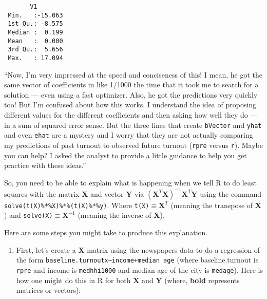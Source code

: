 \documentclass[10pt,]{article}
\providecommand{\tightlist}{%
  \setlength{\itemsep}{0pt}\setlength{\parskip}{0pt}}
\begin{document}
\begin{verbatim}
       V1         
 Min.   :-15.063  
 1st Qu.: -8.575  
 Median :  0.199  
 Mean   :  0.000  
 3rd Qu.:  5.656  
 Max.   : 17.094  
\end{verbatim}

``Now, I'm very impressed at the speed and conciseness of this! I mean,
he got the same vector of coefficients in like 1/1000 the time that it
took me to search for a solution --- even using a fast optimizer. Also,
he got the predictions very quickly too! But I'm confused about how this
works. I understand the idea of proposing different values for the
different coefficients and then asking how well they do --- in a sum of
squared error sense. But the three lines that create \texttt{bVector}
and \texttt{yhat} and even \texttt{ehat} are a mystery and I worry that
they are not actually comparing my predictions of past turnout to
observed future turnout (\texttt{rpre} versus \texttt{r}). Maybe you can
help? I asked the analyst to provide a little guidance to help you get
practice with these ideas.''

So, you need to be able to explain what is happening when we tell R to
do least squares with the matrix \(\bm{X}\) and vector \(\bm{Y}\) via
\((\bm{X}^{T}\bm{X})^{-1}\bm{X}^{T}\bm{Y}\) using the command
\texttt{solve(t(X)\%*\%X)\%*\%(t(X)\%*\%y)}. Where
\texttt{t(X)}\(\equiv \bm{X}^{T}\) (meaning the transpose of \(\bm{X}\))
and \texttt{solve(X)}\(\equiv \bm{X}^{-1}\) (meaning the inverse of
\(\bm{X}\)).

Here are some steps you might take to produce this explanation.

\begin{enumerate}
\def\labelenumi{\arabic{enumi}.}
\tightlist
\item
  First, let's create a \(\bm{X}\) matrix using the newspapers data to
  do a regression of the form
  \texttt{baseline.turnoutx\textasciitilde{}income+median\ age} (where
  baseline.turnout is \texttt{rpre} and income is \texttt{medhhi1000}
  and median age of the city is \texttt{medage}). Here is how one might
  do this in R for both \(\bm{X}\) and \(\bm{Y}\) (where, \textbf{bold}
  represents matrices or vectors):
\end{enumerate}
\end{document}
